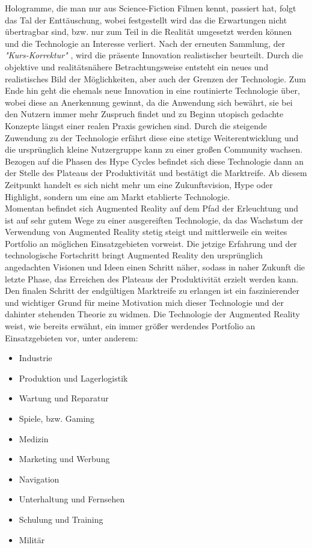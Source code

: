 Hologramme, die man nur aus Science-Fiction Filmen kennt, passiert hat, 
folgt das Tal der Enttäuschung, wobei festgestellt wird das die Erwartungen nicht übertragbar sind, bzw. nur zum Teil in die Realität 
umgesetzt werden können und die Technologie an Interesse verliert. Nach der erneuten Sammlung, der \textit{"Kurs-Korrektur"} 
\cite{hypecycle.2019o}, wird die präsente Innovation realistischer beurteilt. 
Durch die objektive und realitätsnähere Betrachtungsweise entsteht ein neues und realistisches Bild der Möglichkeiten, aber auch 
der Grenzen der Technologie. Zum Ende hin geht die ehemals neue Innovation in eine routinierte Technologie über, wobei diese an 
Anerkennung gewinnt, da die Anwendung sich bewährt, sie bei den Nutzern immer mehr Zuspruch findet und zu Beginn utopisch gedachte Konzepte 
längst einer realen Praxis gewichen sind. Durch die steigende Zuwendung zu der Technologie erfährt diese eine stetige Weiterentwicklung
und die ursprünglich kleine Nutzergruppe kann zu einer großen Community wachsen. Bezogen auf die Phasen des Hype Cycles befindet sich diese 
Technologie dann an der Stelle des Plateaus der Produktivität und bestätigt die Marktreife. Ab diesem Zeitpunkt handelt es sich nicht mehr 
um eine Zukunftsvision, Hype oder Highlight, sondern um eine am Markt etablierte Technologie.
\\ 
\linebreak
Momentan befindet sich Augmented Reality auf dem Pfad der Erleuchtung und ist auf sehr gutem Wege zu einer ausgereiften Technologie, 
da das Wachstum der Verwendung von Augmented Reality stetig steigt und mittlerweile ein weites Portfolio an möglichen Einsatzgebieten 
vorweist. Die jetzige Erfahrung und der technologische Fortschritt bringt Augmented Reality den ursprünglich angedachten Visionen und Ideen 
einen Schritt näher, sodass in naher Zukunft die letzte Phase, das Erreichen des Plateaus der Produktivität erzielt werden kann. Den finalen 
Schritt der endgültigen Marktreife zu erlangen ist ein faszinierender und wichtiger Grund für meine Motivation mich dieser Technologie und 
der dahinter stehenden Theorie zu widmen. 
Die Technologie der Augmented Reality weist, wie bereits erwähnt, ein immer größer werdendes Portfolio an Einsatzgebieten vor, unter anderem: 
\begin{itemize}
    \item Industrie 
    \item Produktion und Lagerlogistik
    \item Wartung und Reparatur
    \item Spiele, bzw. Gaming 
    \item Medizin
    \item Marketing und Werbung
    \item Navigation
    \item Unterhaltung und Fernsehen 
    \item Schulung und Training
    \item Militär
\end{itemize} 
